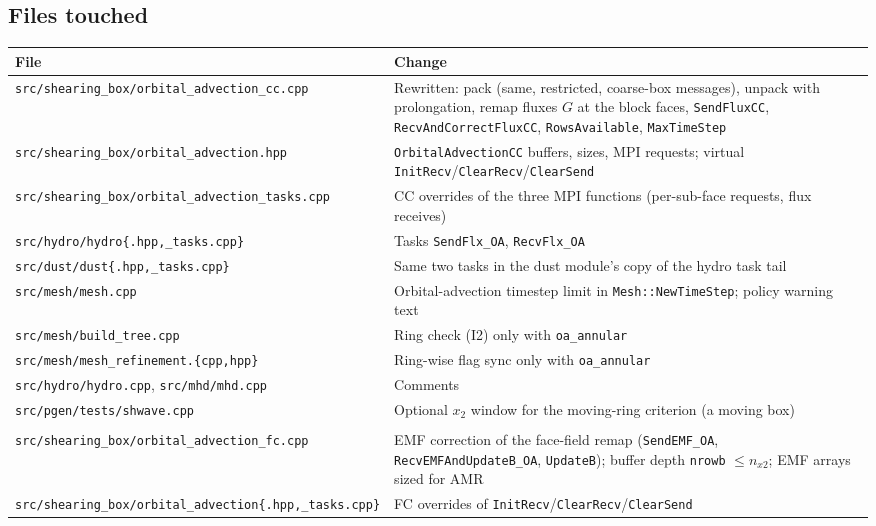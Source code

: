 \documentclass[11pt]{article}
\newcommand{\code}[1]{\texttt{#1}}
\newcommand{\file}[1]{\texttt{\small #1}}
\newcommand{\fn}[1]{\texttt{\small #1}}
\begin{document}
\subsection{Files touched}
\begin{center}
\small
\begin{tabular}{@{}>{\raggedright\arraybackslash}p{5.2cm}p{9.2cm}@{}}
\toprule
File & Change \\
\midrule
\file{src/shearing\_box/orbital\_advection\_cc.cpp} & Rewritten: pack (same,
restricted, coarse-box messages), unpack with prolongation, remap fluxes $G$ at the block
faces, \fn{SendFluxCC}, \fn{RecvAndCorrectFluxCC}, \fn{RowsAvailable},
\fn{MaxTimeStep} \\
\file{src/shearing\_box/orbital\_advection.hpp} & \fn{OrbitalAdvectionCC} buffers,
sizes, MPI requests; virtual \fn{InitRecv}/\fn{ClearRecv}/\fn{ClearSend} \\
\file{src/shearing\_box/orbital\_advection\_tasks.cpp} & CC overrides of the three
MPI functions (per-sub-face requests, flux receives) \\
\file{src/hydro/hydro\{.hpp,\_tasks.cpp\}} & Tasks \fn{SendFlx\_OA}, \fn{RecvFlx\_OA} \\
\file{src/dust/dust\{.hpp,\_tasks.cpp\}} & Same two tasks in the dust module's copy of
the hydro task tail \\
\file{src/mesh/mesh.cpp} & Orbital-advection timestep limit in \fn{Mesh::NewTimeStep};
policy warning text \\
\file{src/mesh/build\_tree.cpp} & Ring check (I2) only with \code{oa\_annular} \\
\file{src/mesh/mesh\_refinement.\{cpp,hpp\}} & Ring-wise flag sync only with
\code{oa\_annular} \\
\file{src/hydro/hydro.cpp}, \file{src/mhd/mhd.cpp} & Comments \\
\file{src/pgen/tests/shwave.cpp} & Optional $x_2$ window for the moving-ring criterion
(a moving box) \\
\midrule
\multicolumn{2}{@{}l}{\textbf{MHD on rings (branch \code{fargo-amr-mhd})}}\\
\file{src/shearing\_box/orbital\_advection\_fc.cpp} & EMF correction of the face-field
remap (\fn{SendEMF\_OA}, \fn{RecvEMFAndUpdateB\_OA}, \fn{UpdateB}); buffer depth
\code{nrowb} $\le n_{x2}$; EMF arrays sized for AMR \\
\file{src/shearing\_box/orbital\_advection\{.hpp,\_tasks.cpp\}} & FC overrides of
\fn{InitRecv}/\fn{ClearRecv}/\fn{ClearSend} \\

\end{tabular}
\end{center}
\end{document}

